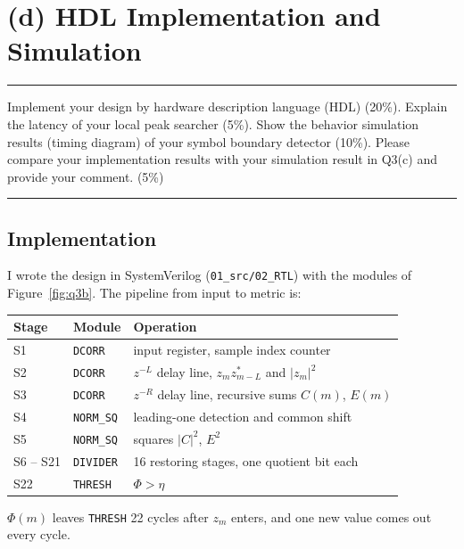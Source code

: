 \documentclass[12pt,a4paper]{report}
\newcommand{\question}[1]{%
    \hrule
    \vspace{0.2cm}
    #1
    \vspace{0.2cm}
    \hrule
    \vspace{0.5cm}
}
\begin{document}
\newpage

\section{(d) HDL Implementation and Simulation}

\question{Implement your design by hardware description language (HDL) (20\%). Explain the latency of your local peak
searcher (5\%). Show the behavior simulation results (timing diagram) of your symbol boundary detector (10\%). Please
compare your implementation results with your simulation result in Q3(c) and provide your comment. (5\%)}

\subsection{Implementation}

I wrote the design in SystemVerilog (\texttt{01\_src/02\_RTL}) with the modules of Figure~\ref{fig:q3b}. The
pipeline from input to metric is:
\begin{center}
\setlength{\tabcolsep}{8pt}
\renewcommand{\arraystretch}{1.2}
\begin{tabular}{lll}
\toprule
Stage & Module & Operation \\
\midrule
S1 & \texttt{DCORR} & input register, sample index counter \\
S2 & \texttt{DCORR} & $z^{-L}$ delay line, $z_m z^*_{m-L}$ and $|z_m|^2$ \\
S3 & \texttt{DCORR} & $z^{-R}$ delay line, recursive sums $C(m)$, $E(m)$ \\
S4 & \texttt{NORM\_SQ} & leading-one detection and common shift \\
S5 & \texttt{NORM\_SQ} & squares $|C|^2$, $E^2$ \\
S6 -- S21 & \texttt{DIVIDER} & 16 restoring stages, one quotient bit each \\
S22 & \texttt{THRESH} & $\Phi > \eta$ \\
\bottomrule
\end{tabular}
\end{center}
$\Phi(m)$ leaves \texttt{THRESH} 22 cycles after $z_m$ enters, and one new value comes out every cycle.
\end{document}
